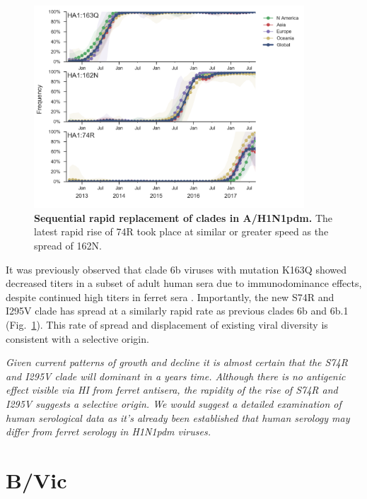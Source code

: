 \documentclass[11pt,oneside,letterpaper]{article}
\newcommand{\FIG}[1]{Fig.~\ref{#1}}
\begin{document}
\begin{figure}[H]
  \centering
  \includegraphics[width=0.9\textwidth]{../figures/sep-2017/h1n1pdm_mutations_6b_6b1.png}
  \caption{\textbf{Sequential rapid replacement of clades in A/H1N1pdm.} The latest rapid rise of 74R took place at similar or greater speed as the spread of 162N.
  }
  \label{h1n1pdm_mutations_6b_6b1}
\end{figure}
It was previously observed that clade 6b viruses with mutation K163Q
showed decreased titers in a subset of adult human sera due to
immunodominance effects, despite continued high titers in ferret sera
\cite{linderman2014potential}.
Importantly, the new S74R and I295V clade has spread at a similarly
rapid rate as previous clades 6b and 6b.1 (\FIG{h1n1pdm_mutations_6b_6b1}). This rate of spread and
displacement of existing viral diversity is consistent with a selective
origin.



\emph{Given current patterns of growth and decline it is almost certain
that the S74R and I295V clade will dominant in a years time. Although
there is no antigenic effect visible via HI from ferret antisera, the
rapidity of the rise of S74R and I295V suggests a selective origin. We
would suggest a detailed examination of human serological data as it's
already been established that human serology may differ from ferret
serology in H1N1pdm viruses.}

\clearpage
\section*{B/Vic}
\end{document}
